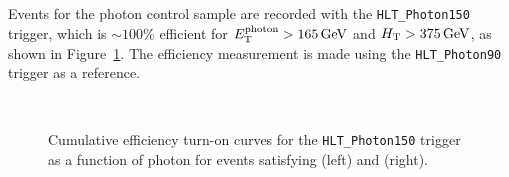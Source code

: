 Events for the photon control sample are recorded with the
\verb!HLT_Photon150! trigger, which is $\sim100\%$ efficient for
$E_{\rm T}^{\rm photon} > 165\,\text{Ge\hspace{-.08em}V}$ and $\mbox{$H_\text{T}$} > 375\,\text{Ge\hspace{-.08em}V}$, as shown
in Figure~\ref{fig:eff-photon}. The efficiency measurement is made
using the \verb!HLT_Photon90! trigger as a reference.

\begin{figure}[!h]
  \begin{center}
  \\     
    \caption{\label{fig:eff-photon}
    Cumulative efficiency turn-on curves for the \texttt{HLT\_Photon150} trigger 
    as a function of photon \pt for events satisfying \njetlow 
    (left) and \njethigh (right).} 
  \end{center}
\end{figure}

\FloatBarrier
